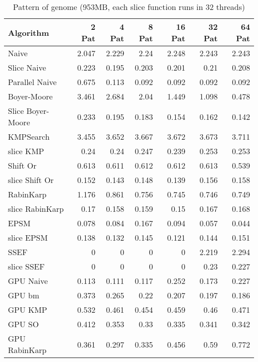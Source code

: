\documentclass[11pt]{article}       %
\begin{document}
\begin{table}[htbp]
  \centering
  \caption{Pattern of genome (953MB, each slice function runs in 32 threads)}
    \begin{tabular}{lrrrrrr}\label{t2}
Algorithm & 2 Pat & 4 Pat & 8 Pat & 16 Pat & 32 Pat & 64 Pat \\
 \hline
    Naive & 2.047 & 2.229 & 2.24  & 2.248 & 2.243 & 2.243 \\
    Slice Naive & 0.223 & 0.195 & 0.203 & 0.201 & 0.21  & 0.208 \\
    Parallel Naive & 0.675 & 0.113 & 0.092 & 0.092 & 0.092 & 0.092 \\
    {Boyer-Moore} & 3.461 & 2.684 & 2.04  & 1.449 & 1.098 & 0.478 \\
    Slice Boyer-Moore & 0.233 & 0.195 & 0.183 & 0.154 & 0.162 & 0.142 \\
    KMPSearch & 3.455 & 3.652 & 3.667 & 3.672 & 3.673 & 3.711 \\
    slice KMP & 0.24  & 0.24  & 0.247 & 0.239 & 0.253 & 0.253 \\
    Shift Or & 0.613 & 0.611 & 0.612 & 0.612 & 0.613 & 0.539 \\
    slice Shift Or & 0.152 & 0.143 & 0.148 & 0.139 & 0.156 & 0.158 \\
    RabinKarp & 1.176 & 0.861 & 0.756 & 0.745 & 0.746 & 0.749 \\
    slice RabinKarp & 0.17  & 0.158 & 0.159 & 0.15  & 0.167 & 0.168 \\
    EPSM  & 0.078 & 0.084 & 0.167 & 0.094 & 0.057 & 0.044 \\
    slice EPSM & 0.138 & 0.132 & 0.145 & 0.121 & 0.144 & 0.151 \\
    SSEF  &   0 & 0 & 0 & 0    & 2.219 & 2.294 \\
    slice SSEF & 0 & 0 & 0 & 0 & 0.23  & 0.227 \\
    GPU Naive & 0.113 & 0.111 & 0.117 & 0.252 & 0.173 & 0.227 \\
    GPU bm & 0.373 & 0.265 & 0.22  & 0.207 & 0.197 & 0.186 \\
    GPU KMP & 0.532 & 0.461 & 0.454 & 0.459 & 0.46  & 0.471 \\
    GPU SO & 0.412 & 0.353 & 0.33  & 0.335 & 0.341 & 0.342 \\
    GPU RabinKarp & 0.361 & 0.297 & 0.335 & 0.456 & 0.59  & 0.772 \\
    \end{tabular}%
  \label{tab:addlabel}%
\end{table}%
\end{document}
